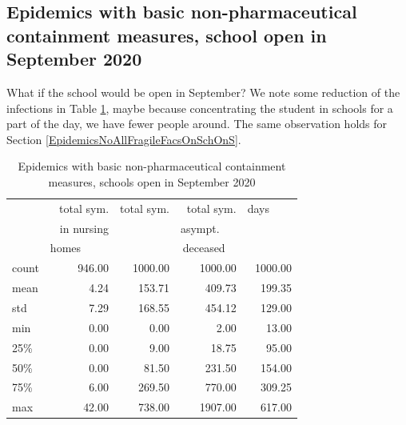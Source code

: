 \documentclass[11pt]{article}
\begin{document}
\subsection{Epidemics with basic non-pharmaceutical containment measures, school open in September 2020}
\label{EpidemicsWithAndSchoolS}


What if the school would be open in September? We note some reduction of the infections in Table \ref{EpidemicsWithAndSchoolT}, maybe because concentrating the student in schools for a part of the day, we have fewer people around. The same observation holds for Section \ref{EpidemicsNoAllFragileFacsOnSchOnS}.

\begin{table}[H]
\center
\small
\begin{tabular}{lrrrr}
\toprule
{} & total sym.        &  total sym. & total sym.     & days~~~~ \\
{} & in nursing        &                  & asympt.~~~  & \\
{} & homes~~~~~  &                  & deceased~~ & \\
\midrule
count &     946.00 &             1000.00 &                 1000.00 & 1000.00 \\
mean  &       4.24 &              153.71 &                  409.73 &  199.35 \\
std   &       7.29 &              168.55 &                  454.12 &  129.00 \\
min   &       0.00 &                0.00 &                    2.00 &   13.00 \\
25\%   &       0.00 &                9.00 &                   18.75 &   95.00 \\
50\%   &       0.00 &               81.50 &                  231.50 &  154.00 \\
75\%   &       6.00 &              269.50 &                  770.00 &  309.25 \\
max   &      42.00 &              738.00 &                 1907.00 &  617.00 \\
\bottomrule
\end{tabular}

\label{EpidemicsWithAndSchoolT}
\caption{Epidemics with basic non-pharmaceutical containment measures, schools open in September 2020}
\end{table}
\end{document}
